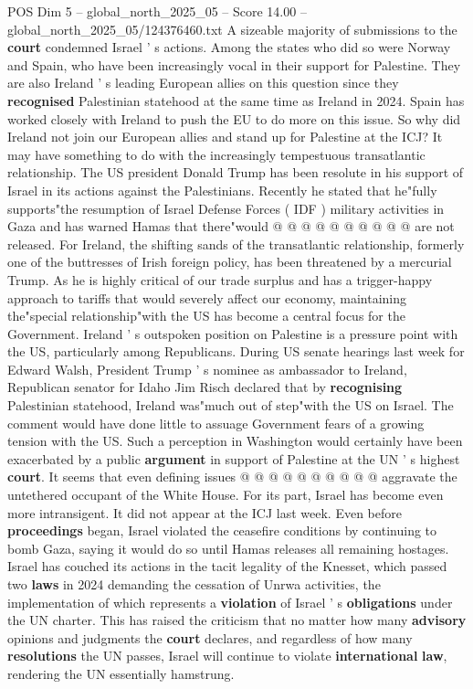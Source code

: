 \begin{textsample}{POS Dim 5 – global\_north\_2025\_05 – Score 14.00 – global\_north\_2025\_05/124376460.txt}
A sizeable majority of submissions to the \textbf{court} condemned Israel ' s actions.
Among the states who did so were Norway and Spain, who have been increasingly vocal in their support for Palestine.
They are also Ireland ' s leading European allies on this question since they \textbf{recognised} Palestinian statehood at the same time as Ireland in 2024.
Spain has worked closely with Ireland to push the EU to do more on this issue.
So why did Ireland not join our European allies and stand up for Palestine at the ICJ?
It may have something to do with the increasingly tempestuous transatlantic relationship.
The US president Donald Trump has been resolute in his support of Israel in its actions against the Palestinians.
Recently he stated that he"fully supports"the resumption of Israel Defense Forces ( IDF ) military activities in Gaza and has warned Hamas that there"would @ @ @ @ @ @ @ @ @ @ are not released.
For Ireland, the shifting sands of the transatlantic relationship, formerly one of the buttresses of Irish foreign policy, has been threatened by a mercurial Trump.
As he is highly critical of our trade surplus and has a trigger-happy approach to tariffs that would severely affect our economy, maintaining the"special relationship"with the US has become a central focus for the Government.
Ireland ' s outspoken position on Palestine is a pressure point with the US, particularly among Republicans.
During US senate hearings last week for Edward Walsh, President Trump ' s nominee as ambassador to Ireland, Republican senator for Idaho Jim Risch declared that by \textbf{recognising} Palestinian statehood, Ireland was"much out of step"with the US on Israel.
The comment would have done little to assuage Government fears of a growing tension with the US.
Such a perception in Washington would certainly have been exacerbated by a public \textbf{argument} in support of Palestine at the UN ' s highest \textbf{court}.
It seems that even defining issues @ @ @ @ @ @ @ @ @ @ aggravate the untethered occupant of the White House.
For its part, Israel has become even more intransigent.
It did not appear at the ICJ last week.
Even before \textbf{proceedings} began, Israel violated the ceasefire conditions by continuing to bomb Gaza, saying it would do so until Hamas releases all remaining hostages.
Israel has couched its actions in the tacit legality of the Knesset, which passed two \textbf{laws} in 2024 demanding the cessation of Unrwa activities, the implementation of which represents a \textbf{violation} of Israel ' s \textbf{obligations} under the UN charter.
This has raised the criticism that no matter how many \textbf{advisory} opinions and judgments the \textbf{court} declares, and regardless of how many \textbf{resolutions} the UN passes, Israel will continue to violate \textbf{international} \textbf{law}, rendering the UN essentially hamstrung.

\end{textsample}
